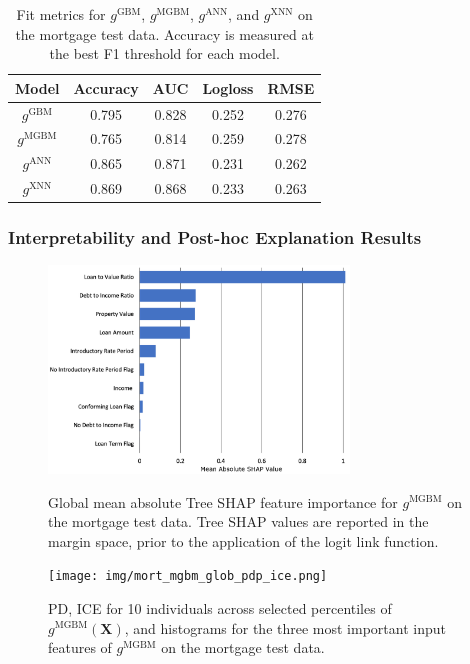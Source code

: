 \documentclass[information,article,submit,moreauthors,pdftex]{definitions/mdpi}
\begin{document}
\begin{table}[H]
\label{tab:mort_acc}
\caption{Fit metrics for $g^\text{GBM}$, $g^\text{MGBM}$, $g^\text{ANN}$, and $g^\text{XNN}$ on the mortgage test data. Accuracy is measured at the best F1 threshold for each model.}
\centering
\begin{tabular}{ccccc}
\toprule
\textbf{Model}		& \textbf{Accuracy}	& \textbf{AUC}	 & \textbf{Logloss}	& \textbf{RMSE}\\
\midrule	
$g^\text{GBM}$		& 0.795	& 0.828	& 0.252	& 0.276 \\
$g^\text{MGBM}$	& 0.765	& 0.814	& 0.259	& 0.278 \\
$g^\text{ANN}$		& 0.865	& 0.871 	& 0.231 	& 0.262 \\
$g^\text{XNN}$		& 0.869	& 0.868	& 0.233	& 0.263 \\
\bottomrule
\end{tabular}
\end{table}

\subsubsection{Interpretability and Post-hoc Explanation Results}

\begin{figure}[H]
\centering
\includegraphics[width=8cm]{img/mort_mgbm_glob.png}
\label{fig:mort_mgbm_glob}
\caption{Global mean absolute Tree SHAP feature importance for $g^\text{MGBM}$ on the mortgage test data. Tree SHAP values are reported in the margin space, prior to the application of the logit link function.}
\end{figure} 

\begin{figure}[H]
\centering
\texttt{[image: img/mort\_mgbm\_glob\_pdp\_ice.png]}
\label{fig:mort_mgbm_glob_pdp_ice}
\caption{PD, ICE for 10 individuals across selected percentiles of $g^\text{MGBM}(\mathbf{X})$, and histograms for the three most important input features of $g^\text{MGBM}$ on the mortgage test data.}
\end{figure}   
\end{document}
